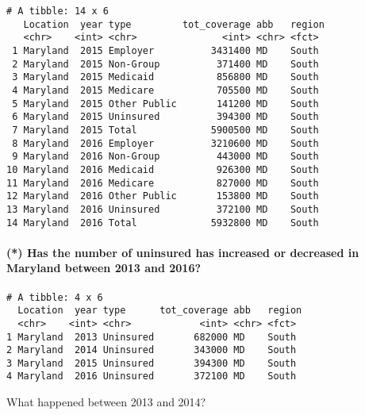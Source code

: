 \documentclass[]{article}
\newenvironment{Shaded}{\begin{snugshade}}{\end{snugshade}}
\newcommand{\KeywordTok}[1]{\textcolor[rgb]{0.13,0.29,0.53}{\textbf{#1}}}
\newcommand{\NormalTok}[1]{#1}
\newcommand{\OperatorTok}[1]{\textcolor[rgb]{0.81,0.36,0.00}{\textbf{#1}}}
\newcommand{\StringTok}[1]{\textcolor[rgb]{0.31,0.60,0.02}{#1}}
\let\oldparagraph\paragraph
\renewcommand{\paragraph}[1]{\oldparagraph{#1}\mbox{}}
\begin{document}
\begin{verbatim}
# A tibble: 14 x 6
   Location  year type         tot_coverage abb   region
   <chr>    <int> <chr>               <int> <chr> <fct> 
 1 Maryland  2015 Employer          3431400 MD    South 
 2 Maryland  2015 Non-Group          371400 MD    South 
 3 Maryland  2015 Medicaid           856800 MD    South 
 4 Maryland  2015 Medicare           705500 MD    South 
 5 Maryland  2015 Other Public       141200 MD    South 
 6 Maryland  2015 Uninsured          394300 MD    South 
 7 Maryland  2015 Total             5900500 MD    South 
 8 Maryland  2016 Employer          3210600 MD    South 
 9 Maryland  2016 Non-Group          443000 MD    South 
10 Maryland  2016 Medicaid           926300 MD    South 
11 Maryland  2016 Medicare           827000 MD    South 
12 Maryland  2016 Other Public       153800 MD    South 
13 Maryland  2016 Uninsured          372100 MD    South 
14 Maryland  2016 Total             5932800 MD    South 
\end{verbatim}

\hypertarget{has-the-number-of-uninsured-has-increased-or-decreased-in-maryland-between-2013-and-2016}{%
\paragraph{(*) Has the number of uninsured has increased or decreased in
Maryland between 2013 and
2016?}\label{has-the-number-of-uninsured-has-increased-or-decreased-in-maryland-between-2013-and-2016}}

\begin{Shaded}
\end{Shaded}

\begin{verbatim}
# A tibble: 4 x 6
  Location  year type      tot_coverage abb   region
  <chr>    <int> <chr>            <int> <chr> <fct> 
1 Maryland  2013 Uninsured       682000 MD    South 
2 Maryland  2014 Uninsured       343000 MD    South 
3 Maryland  2015 Uninsured       394300 MD    South 
4 Maryland  2016 Uninsured       372100 MD    South 
\end{verbatim}

What happened between 2013 and 2014?
\end{document}
